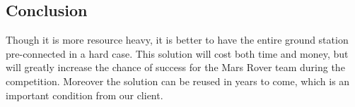 \documentclass[onecolumn, draftclsnofoot, 10pt, compsoc]{IEEEtran}
\begin{document}
\subsection{Conclusion}
Though it is more resource heavy, it is better to have the entire ground station pre-connected in a hard case.
This solution will cost both time and money, but will greatly increase the chance of success for the Mars Rover team during the competition.
Moreover the solution can be reused in years to come, which is an important condition from our client.
\end{document}

